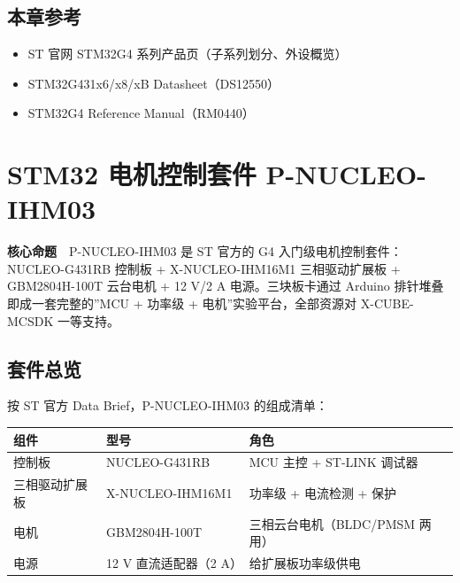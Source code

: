 \documentclass[
  UTF8,
  scheme=plain,
  fontsize=10pt,
  openany
]{ctexbook}
\begin{document}
\section{本章参考}\label{ux672cux7ae0ux53c2ux8003}

\begin{itemize}
\tightlist
\item
  ST 官网 STM32G4 系列产品页（子系列划分、外设概览）
\item
  STM32G431x6/x8/xB Datasheet（DS12550）
\item
  STM32G4 Reference Manual（RM0440）
\end{itemize}

\clearpage

\chapter{STM32 电机控制套件
P-NUCLEO-IHM03}\label{stm32-ux7535ux673aux63a7ux5236ux5957ux4ef6-p-nucleo-ihm03}

\begin{epigraph}

\textbf{核心命题}　P-NUCLEO-IHM03 是 ST 官方的 G4
入门级电机控制套件：NUCLEO-G431RB 控制板 + X-NUCLEO-IHM16M1
三相驱动扩展板 + GBM2804H-100T 云台电机 + 12 V/2 A 电源。三块板卡通过
Arduino 排针堆叠即成一套完整的''MCU + 功率级 +
电机''实验平台，全部资源对 X-CUBE-MCSDK 一等支持。

\end{epigraph}

\section{套件总览}\label{ux5957ux4ef6ux603bux89c8}

按 ST 官方 Data Brief，P-NUCLEO-IHM03 的组成清单：

{\def\LTcaptype{none} %
\begin{longtable}[]{@{}lll@{}}
\toprule\noalign{}
组件 & 型号 & 角色 \\
\midrule\noalign{}
\endhead
\bottomrule\noalign{}
\endlastfoot
控制板 & NUCLEO-G431RB & MCU 主控 + ST-LINK 调试器 \\
三相驱动扩展板 & X-NUCLEO-IHM16M1 & 功率级 + 电流检测 + 保护 \\
电机 & GBM2804H-100T & 三相云台电机（BLDC/PMSM 两用） \\
电源 & 12 V 直流适配器（2 A） & 给扩展板功率级供电 \\
\end{longtable}
}
\end{document}
